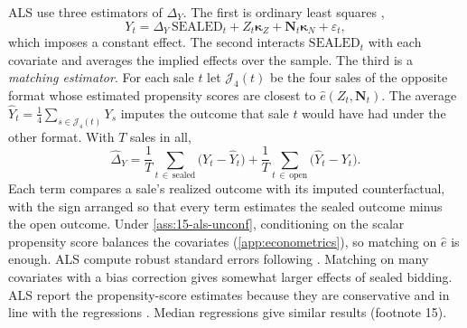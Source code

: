ALS use three estimators of $\Delta_Y$. The first is ordinary least squares \citep[eq.~(6)]{AtheyLevinSeira2011},
\begin{equation}\label{eq:15-als-ols}
Y_t=\Delta_Y\,\mathrm{SEALED}_t+Z_t\bm\kappa_Z+\bm N_t\bm\kappa_N+\varepsilon_t ,
\end{equation}
which imposes a constant effect. The second interacts $\mathrm{SEALED}_t$ with each covariate and averages
the implied effects over the sample. The third is a \emph{matching estimator}. For each sale $t$ let
$\mathcal J_4(t)$ be the four sales of the opposite format whose estimated propensity scores are closest
to $\hat e(Z_t,\bm N_t)$. The average $\hat Y_t=\frac{1}{4}\sum_{s\in\mathcal J_4(t)}Y_s$ imputes the
outcome that sale $t$ would have had under the other format. With $T$ sales in all,
\citep[eq.~(7)]{AtheyLevinSeira2011}
\begin{equation}\label{eq:15-als-match}
\hat\Delta_Y=\frac{1}{T}\sum_{t\,\in\,\text{sealed}}\bigl(Y_t-\hat Y_t\bigr)+\frac{1}{T}\sum_{t\,\in\,\text{open}}\bigl(\hat Y_t-Y_t\bigr).
\end{equation}
Each term compares a sale's realized outcome with its imputed counterfactual, with the sign arranged
so that every term estimates the sealed outcome minus the open outcome. Under
\cref{ass:15-als-unconf}, conditioning on the scalar propensity score balances the covariates
(\cref{app:econometrics}), so matching on $\hat e$ is enough. ALS compute robust standard errors following
\citet{AbadieImbens2006}. Matching on many covariates with a bias correction gives somewhat larger
effects of sealed bidding. ALS report the propensity-score estimates because they are conservative and
in line with the regressions \citep[footnote 14]{AtheyLevinSeira2011}. Median regressions give similar
results (footnote 15).


